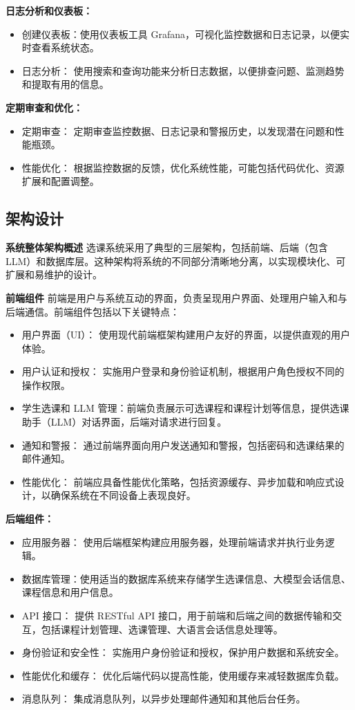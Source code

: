 \documentclass{article}
\begin{document}
\textbf{日志分析和仪表板：}
\begin{itemize}
    \item 创建仪表板：使用仪表板工具 Grafana，可视化监控数据和日志记录，以便实时查看系统状态。
    \item 日志分析： 使用搜索和查询功能来分析日志数据，以便排查问题、监测趋势和提取有用的信息。
\end{itemize}

\textbf{定期审查和优化：}
\begin{itemize}
    \item 定期审查： 定期审查监控数据、日志记录和警报历史，以发现潜在问题和性能瓶颈。
    \item 性能优化： 根据监控数据的反馈，优化系统性能，可能包括代码优化、资源扩展和配置调整。
\end{itemize}

\subsection{架构设计}
\textbf{系统整体架构概述}
选课系统采用了典型的三层架构，包括前端、后端（包含 LLM）和数据库层。这种架构将系统的不同部分清晰地分离，以实现模块化、可扩展和易维护的设计。

\textbf{前端组件}
前端是用户与系统互动的界面，负责呈现用户界面、处理用户输入和与后端通信。前端组件包括以下关键特点：
\begin{itemize}
    \item 用户界面（UI）： 使用现代前端框架构建用户友好的界面，以提供直观的用户体验。
    \item 用户认证和授权： 实施用户登录和身份验证机制，根据用户角色授权不同的操作权限。
    \item 学生选课和 LLM 管理：前端负责展示可选课程和课程计划等信息，提供选课助手（LLM）对话界面，后端对请求进行回复。
    \item 通知和警报： 通过前端界面向用户发送通知和警报，包括密码和选课结果的邮件通知。
    \item 性能优化： 前端应具备性能优化策略，包括资源缓存、异步加载和响应式设计，以确保系统在不同设备上表现良好。
\end{itemize}

\textbf{后端组件：}
\begin{itemize}
    \item 应用服务器： 使用后端框架构建应用服务器，处理前端请求并执行业务逻辑。
    \item 数据库管理：使用适当的数据库系统来存储学生选课信息、大模型会话信息、课程信息和用户信息。
    \item API 接口： 提供 RESTful API 接口，用于前端和后端之间的数据传输和交互，包括课程计划管理、选课管理、大语言会话信息处理等。
    \item 身份验证和安全性： 实施用户身份验证和授权，保护用户数据和系统安全。
    \item 性能优化和缓存： 优化后端代码以提高性能，使用缓存来减轻数据库负载。
    \item 消息队列： 集成消息队列，以异步处理邮件通知和其他后台任务。
\end{itemize}
\end{document}
